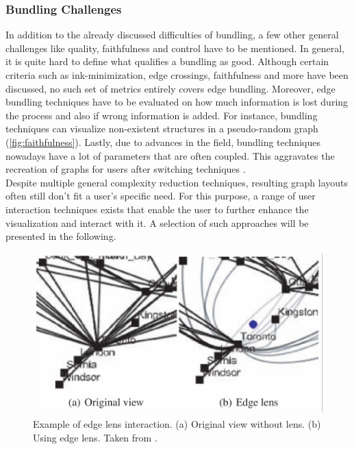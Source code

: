 \subsubsection{Bundling Challenges}
In addition to the already discussed difficulties of bundling, a few other general challenges like quality, faithfulness and control have to be mentioned.
In general, it is quite hard to define what qualifies a bundling as good. Although certain criteria such as ink-minimization, edge crossings, faithfulness and more have been discussed, no such set of metrics entirely covers edge bundling\cite{Lhuillier2017}. 
Moreover, edge bundling techniques have to be evaluated on how much information is lost during the process and also if wrong information is added. For instance, bundling techniques can visualize non-existent structures in a pseudo-random graph (\autoref{fig:faithfulness}).
Lastly, due to advances in the field, bundling techniques nowadays have a lot of parameters that are often coupled. This aggravates the recreation of graphs for users after switching techniques \cite{Lhuillier2017}.\\
Despite multiple general complexity reduction techniques, resulting graph layouts often still don't fit a user's specific need. 
For this purpose, a range of user interaction techniques exists that enable the user to further enhance the visualization and interact with it. A selection of such approaches will be presented in the following. 

\begin{figure}
    \centering
    \includegraphics[scale=0.8]{media/edge_lense.pdf}
    \caption{Example of edge lens interaction. (a) Original view without lens. (b) Using edge lens. Taken from \cite{VonLandesberger2011}.}
    \label{fig:edge_lense}
\end{figure}
